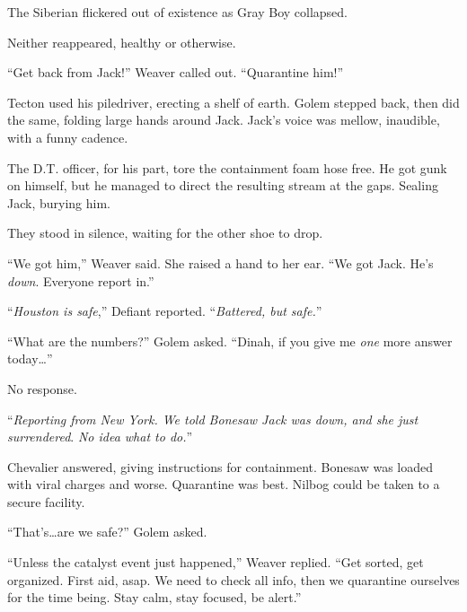 The Siberian flickered out of existence as Gray Boy collapsed.



Neither reappeared, healthy or otherwise.



``Get back from Jack!''  Weaver called out.  ``Quarantine him!''



Tecton used his piledriver, erecting a shelf of earth.  Golem stepped back, then did the same, folding large hands around Jack.  Jack's voice was mellow, inaudible, with a funny cadence.



The D.T. officer, for his part, tore the containment foam hose free.  He got gunk on himself, but he managed to direct the resulting stream at the gaps.  Sealing Jack, burying him.



They stood in silence, waiting for the other shoe to drop.



``We got him,'' Weaver said.  She raised a hand to her ear.  ``We got Jack.  He's \emph{down}.  Everyone report in.''



``\emph{Houston is safe},'' Defiant reported.  ``\emph{Battered, but safe.}''



``What are the numbers?'' Golem asked.  ``Dinah, if you give me \emph{one} more answer today\ldots''



No response.



``\emph{Reporting from New York.  We told Bonesaw Jack was down, and she just surrendered}.  \emph{No idea what to do.}''



Chevalier answered, giving instructions for containment.  Bonesaw was loaded with viral charges and worse.  Quarantine was best.  Nilbog could be taken to a secure facility.



``That's\ldots are we safe?''  Golem asked.



``Unless the catalyst event just happened,'' Weaver replied.  ``Get sorted, get organized.  First aid, asap.  We need to check all info, then we quarantine ourselves for the time being.  Stay calm, stay focused, be alert.''



